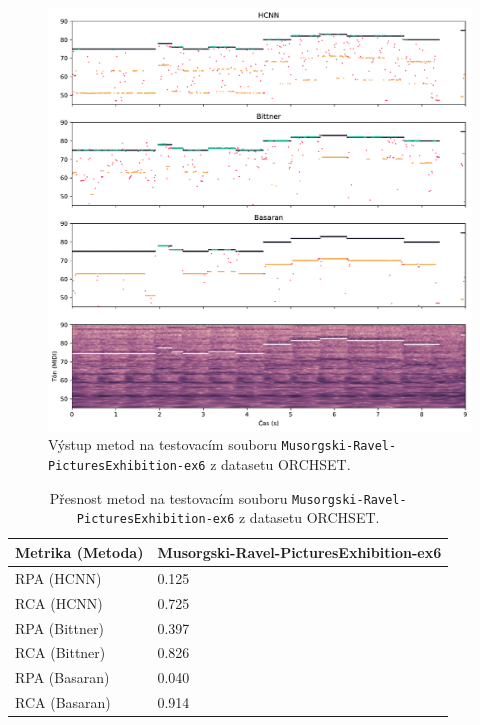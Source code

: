 \begin{figure}[h]\centering
\includegraphics[width=\textwidth,height=\textheight,keepaspectratio]{../img/vysledky/orchset_Musorgski-Ravel-PicturesExhibition-ex6}
\caption{Výstup metod na testovacím souboru \texttt{Musorgski-Ravel-PicturesExhibition-ex6} z datasetu ORCHSET.}
\label{obr:orchset_Musorgski-Ravel-PicturesExhibition-ex6}
\end{figure}

\begin{table}[h]
\centering

    \begin{tabular}{ll}
    \toprule
    Metrika (Metoda) & Musorgski-Ravel-PicturesExhibition-ex6 \\
    \midrule
          RPA (HCNN) &                                  0.125 \\
          RCA (HCNN) &                                  0.725 \\
      RPA (Bittner) &                                  0.397 \\
      RCA (Bittner) &                                  0.826 \\
      RPA (Basaran) &                                  0.040 \\
      RCA (Basaran) &                                  0.914 \\
    \bottomrule
    \end{tabular}

\caption{Přesnost metod na testovacím souboru \texttt{Musorgski-Ravel-PicturesExhibition-ex6} z datasetu ORCHSET.}\label{tab:orchset_Musorgski-Ravel-PicturesExhibition-ex6}
\end{table}


